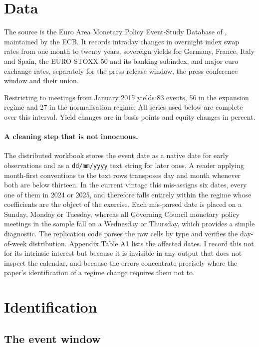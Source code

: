 \documentclass[11pt]{article}
\begin{document}
\section{Data}
\label{sec:data}

The source is the Euro Area Monetary Policy Event-Study Database of
\citet{altavilla2019}, maintained by the ECB. It records intraday changes in
overnight index swap rates from one month to twenty years, sovereign yields for
Germany, France, Italy and Spain, the EURO STOXX 50 and its banking subindex, and
major euro exchange rates, separately for the press release window, the press
conference window and their union.

Restricting to meetings from January 2015 yields 83 events, 56 in the expansion
regime and 27 in the normalisation regime. All series used below are complete
over this interval. Yield changes are in basis points and equity changes in
percent.

\paragraph{A cleaning step that is not innocuous.} The distributed workbook
stores the event date as a native date for early observations and as a
\texttt{dd/mm/yyyy} text string for later ones. A reader applying month-first
conventions to the text rows transposes day and month whenever both are below
thirteen. In the current vintage this mis-assigns six dates, every one of them in
2024 or 2025, and therefore falls entirely within the regime whose coefficients
are the object of the exercise. Each mis-parsed date is placed on a Sunday,
Monday or Tuesday, whereas all Governing Council monetary policy meetings in the
sample fall on a Wednesday or Thursday, which provides a simple diagnostic. The
replication code parses the raw cells by type and verifies the day-of-week
distribution. Appendix Table A1 lists the affected dates. I record this not for
its intrinsic interest but because it is invisible in any output that does not
inspect the calendar, and because the errors concentrate precisely where the
paper's identification of a regime change requires them not to.

\section{Identification}
\label{sec:identification}

\subsection{The event window}
\end{document}
